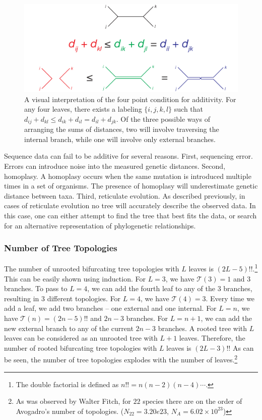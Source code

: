 \begin{figure}
\centering
\includegraphics[]{./fig/background/four_point_condition.pdf}
\caption[The four point condition for additivity]{A visual interpretation of the four point condition for additivity. For any four leaves, there exists a labeling $\{i,j,k,l\}$ such that $d_{ij}+d_{kl}\leq d_{ik}+d_{il} = d_{il}+d_{jk}$. Of the three possible ways of arranging the sums of distances, two will involve traversing the internal branch, while one will involve only external branches.}
\label{fig:bg:four_point_condition}
\end{figure}

Sequence data can fail to be additive for several reasons.
First, sequencing error.
Errors can introduce noise into the measured genetic distances.
Second, homoplasy.
A homoplasy occurs when the same mutation is introduced multiple times in a set of organisms.
The presence of homoplasy will underestimate genetic distance between taxa.
Third, reticulate evolution.
As described previously, in cases of reticulate evolution no tree will accurately describe the observed data.
In this case, one can either attempt to find the tree that best fits the data, or search for an alternative representation of phylogenetic relationships.

\subsubsection{Number of Tree Topologies}
\label{bg:bio:phylo:topologies}

The number of unrooted bifurcating tree topologies with $L$ leaves is $(2L-5)!!$.\footnote{The double factorial is defined as $n!! = n(n-2)(n-4)\cdots$.}
This can be easily shown using induction.
For $L = 3$, we have $\mathcal{T}(3)=1$ and $3$ branches.
To pass to $L = 4$, we can add the fourth leaf to any of the $3$ branches, resulting in $3$ different topologies.
For $L = 4$, we have $\mathcal{T}(4)=3$.
Every time we add a leaf, we add two branches -- one external and one internal.
For $L = n$, we have $\mathcal{T}(n)=(2n-5)!!$ and $2n-3$ branches.
For $L = n+1$, we can add the new external branch to any of the current $2n-3$ branches.
A rooted tree with $L$ leaves can be considered as an unrooted tree with $L+1$ leaves.
Therefore, the number of rooted bifurcating tree topologies with $L$ leaves is $(2L-3)!!$
As can be seen, the number of tree topologies explodes with the number of leaves.\footnote{As was observed by Walter Fitch, for $22$ species there are on the order of Avogadro's number of topologies. ($N_{22}=3.20e23$, $N_{A}=6.02\times 10^{23}$)}


